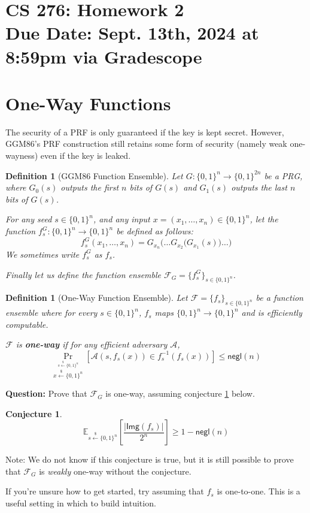 \documentclass[11pt]{article}
\newtheorem{definition}[theorem]{Definition}
\newtheorem{conjecture}[theorem]{Conjecture}
\newenvironment{solution}{\color{blue}\noindent{\bf Solution}\hspace*{1em}}{\qed\medskip}
\numberwithin{equation}{section}
\newcommand{\bbE}{\mathbb{E}}
\newcommand{\cA}{\mathcal{A}}
\newcommand{\cF}{\mathcal{F}}
\newcommand{\negl}{\mathsf{negl}}
\newcommand{\getsr}{\stackrel{\$}{\gets}}
\newcommand{\bin}{\{0,1\}}
\newcommand{\bit}{\bin}
\newcommand{\qed}{\hspace*{\fill}\rule{7pt}{7pt}}
\newcommand{\duedate}{Sept. 13th, 2024 at 8:59pm via Gradescope}
\newif\ifsol
\begin{document}
\section*{CS 276: Homework 2\\ {\small Due Date: \duedate} }

\section{One-Way Functions}
The security of a PRF is only guaranteed if the key is kept secret. However, GGM86's PRF construction still retains some form of security (namely weak one-wayness) even if the key is leaked.

\begin{definition}[GGM86 Function Ensemble]\label{def:GGM-PRF}
    Let $G:\bit^n \to \bit^{2n}$ be a PRG, where $G_0(s)$ outputs the first $n$ bits of $G(s)$ and $G_1(s)$ outputs the last $n$ bits of $G(s)$.
    
    For any seed $s \in \bit^n$, and any input $x = (x_1, \dots, x_n) \in \bit^n$, let the function $f^G_s: \bit^n \to \bit^n$ be defined as follows:
    \[f^G_s(x_1, \dots, x_n) = G_{x_n}\Big(\dots G_{x_2}\big(G_{x_1}(s)\big) \dots \Big)\]
    We sometimes write $f_s^G$ as $f_s$.
    
    Finally let us define the function ensemble $\cF_G = \{f_s^G\}_{s \in \bit^n}$.
\end{definition}

\begin{definition}[One-Way Function Ensemble]
    Let $\cF = \{f_s\}_{s \in \bit^n}$ be a function ensemble where for every $s \in \bit^n$, $f_s$ maps $\bit^n \to \bit^n$ and is efficiently computable. 
    
    $\cF$ is \textbf{one-way} if for any efficient adversary $\cA$,
    \[\Pr_{\stackrel{s \getsr \bit^n}{x \getsr \bit^n}}\left[\cA(s, f_s(x)) \in f_s^{-1}(f_s(x))\right] \leq \negl(n)\]
\end{definition}

\noindent\textbf{Question:} Prove that $\cF_G$ is one-way, assuming conjecture \ref{conj} below.
\begin{conjecture}\label{conj}
    \[\bbE_{s \getsr \bit^n}\left[\frac{|\mathsf{Img}\left(f_s\right)|}{2^n}\right] \geq 1 - \negl(n)\]
\end{conjecture}

Note: We do not know if this conjecture is true, but it is still possible to prove that $\cF_G$ is \textit{weakly} one-way without the conjecture.

If you're unsure how to get started, try assuming that $f_s$ is one-to-one. This is a useful setting in which to build intuition.

\ifsol
$ $

\begin{solution}
TBD
\end{solution}
\fi



\end{document}

